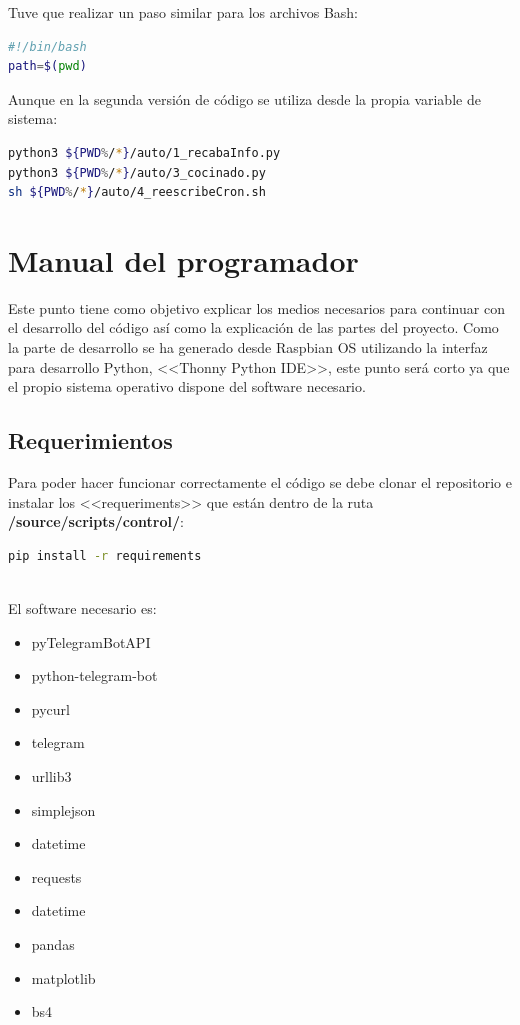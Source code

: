 Tuve que realizar un paso similar para los archivos Bash:
\begin{lstlisting}[language=sh, firstnumber=0, basicstyle=\small]
#!/bin/bash
path=$(pwd)
\end{lstlisting}
Aunque en la segunda versión de código se utiliza desde la propia variable de sistema:

\begin{lstlisting}[language=sh, firstnumber=0, basicstyle=\small]
python3 ${PWD%/*}/auto/1_recabaInfo.py
python3 ${PWD%/*}/auto/3_cocinado.py
sh ${PWD%/*}/auto/4_reescribeCron.sh
\end{lstlisting}

\section{Manual del programador}
Este punto tiene como objetivo explicar los medios necesarios para continuar con el desarrollo del código así como la explicación de las partes del proyecto.
Como la parte de desarrollo se ha generado desde Raspbian OS utilizando la interfaz para desarrollo Python, <<Thonny Python IDE>>, este punto será corto ya que el propio sistema operativo dispone del software necesario.

\subsection{Requerimientos}
Para poder hacer funcionar correctamente el código se debe clonar el repositorio e instalar los <<requeriments>> que están dentro de la ruta \textbf{/source/scripts/control/}:
\begin{lstlisting}[language=sh, firstnumber=0, basicstyle=\normal]
pip install -r requirements
\end{lstlisting}~\\

El software necesario es:
\begin{itemize}
    \item pyTelegramBotAPI
    \item python-telegram-bot
    \item pycurl
    \item telegram
    \item urllib3
    \item simplejson
    \item datetime
    \item requests
    \item datetime
    \item pandas
    \item matplotlib
    \item bs4
\end{itemize}

